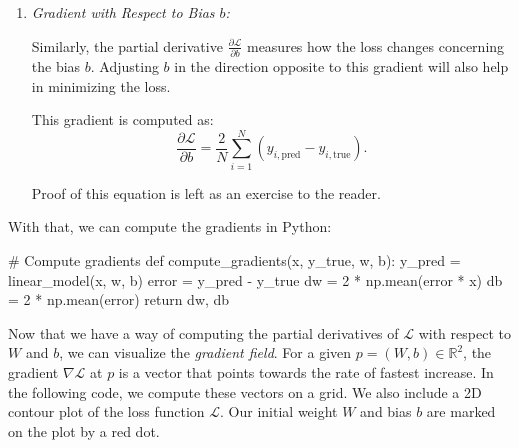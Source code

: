 \begin{enumerate}
    \item \textit{Gradient with Respect to Bias $ b $:}

    Similarly, the partial derivative $\frac{\partial \mathcal{L}}{\partial b}$ measures how the loss changes concerning the bias $b$. Adjusting $b$ in the direction opposite to this gradient will also help in minimizing the loss.

    This gradient is computed as:
    \begin{equation}
        \frac{\partial \mathcal{L}}{\partial b} = \frac{2}{N}\sum_{i=1}^N(y_{i,\text{pred}} - y_{i,\text{true}}).
        \label{eq:gradient_b}
    \end{equation}

    Proof of this equation is left as an exercise to the reader.
\end{enumerate}
\pagebreak
With that, we can compute the gradients in Python:

\begin{codeblock}
# Compute gradients
def compute_gradients(x, y_true, w, b):
    y_pred = linear_model(x, w, b)
    error = y_pred - y_true
    dw = 2 * np.mean(error * x)
    db = 2 * np.mean(error)
    return dw, db
\end{codeblock}

Now that we have a way of computing the partial derivatives of $\mathcal{L}$ with respect to $W$ and $b$, we can visualize the \textit{gradient field}. For a given $p=(W, b) \in \mathbb{R}^2$, the gradient $\nabla \mathcal{L}$ at $p$ is a vector that points towards the rate of fastest increase. In the following code, we compute these vectors on a grid. We also include a 2D contour plot of the loss function $\mathcal{L}$. Our initial weight $W$ and bias $b$ are marked on the plot by a red dot.

